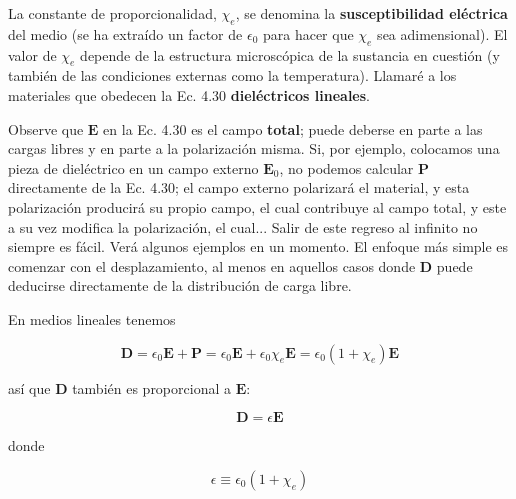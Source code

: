 \documentclass[12pt,a4paper]{report}
\newcommand{\esp}{\vspace{0.5cm}}
\begin{document}
	\esp
	
	La constante de proporcionalidad, $\chi_e$, se denomina la \textbf{susceptibilidad eléctrica} del medio (se ha extraído un factor de $\epsilon_0$ para hacer que $\chi_e$ sea adimensional). El valor de $\chi_e$ depende de la estructura microscópica de la sustancia en cuestión (y también de las condiciones externas como la temperatura). Llamaré a los materiales que obedecen la Ec. 4.30 \textbf{dieléctricos lineales}.
	
	\esp
	
	Observe que $\mathbf{E}$ en la Ec. 4.30 es el campo \textbf{total}; puede deberse en parte a las cargas libres y en parte a la polarización misma. Si, por ejemplo, colocamos una pieza de dieléctrico en un campo externo $\mathbf{E}_0$, no podemos calcular $\mathbf{P}$ directamente de la Ec. 4.30; el campo externo polarizará el material, y esta polarización producirá su propio campo, el cual contribuye al campo total, y este a su vez modifica la polarización, el cual... Salir de este regreso al infinito no siempre es fácil. Verá algunos ejemplos en un momento. El enfoque más simple es comenzar con el desplazamiento, al menos en aquellos casos donde $\mathbf{D}$ puede deducirse directamente de la distribución de carga libre.
	
	\esp
	
	\noindent En medios lineales tenemos
	
	\esp
	
	\begin{equation}
		\mathbf{D} = \epsilon_0 \mathbf{E} + \mathbf{P} = \epsilon_0 \mathbf{E} + \epsilon_0 \chi_e \mathbf{E} = \epsilon_0(1 + \chi_e)\mathbf{E}
	\end{equation}
	
	\esp
	
	\noindent así que $\mathbf{D}$ también es proporcional a $\mathbf{E}$:
	
	\esp
	
	\begin{equation}
		\mathbf{D} = \epsilon \mathbf{E}
	\end{equation}
	
	\esp
	
	\noindent donde
	
	\esp
	
	\begin{equation}
		\epsilon \equiv \epsilon_0(1 + \chi_e)
	\end{equation}
	
	\esp
	
\end{document}
